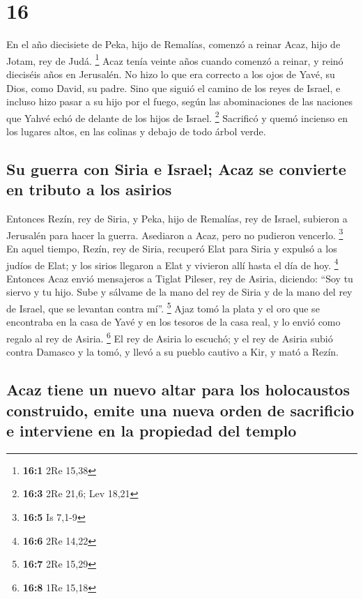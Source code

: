 \hypertarget{section-15}{%
\section{16}\label{section-15}}

 En el año diecisiete de Peka, hijo de Remalías, comenzó a
reinar Acaz, hijo de Jotam, rey de Judá. \footnote{\textbf{16:1} 2Re
  15,38}  Acaz tenía veinte años cuando comenzó a reinar,
y reinó dieciséis años en Jerusalén. No hizo lo que era correcto a los
ojos de Yavé, su Dios, como David, su padre.  Sino que
siguió el camino de los reyes de Israel, e incluso hizo pasar a su hijo
por el fuego, según las abominaciones de las naciones que Yahvé echó de
delante de los hijos de Israel. \footnote{\textbf{16:3} 2Re 21,6; Lev
  18,21}  Sacrificó y quemó incienso en los lugares altos,
en las colinas y debajo de todo árbol verde.

\hypertarget{su-guerra-con-siria-e-israel-acaz-se-convierte-en-tributo-a-los-asirios}{%
\subsection{Su guerra con Siria e Israel; Acaz se convierte en tributo a
los
asirios}\label{su-guerra-con-siria-e-israel-acaz-se-convierte-en-tributo-a-los-asirios}}

 Entonces Rezín, rey de Siria, y Peka, hijo de Remalías,
rey de Israel, subieron a Jerusalén para hacer la guerra. Asediaron a
Acaz, pero no pudieron vencerlo. \footnote{\textbf{16:5} Is 7,1-9}
 En aquel tiempo, Rezín, rey de Siria, recuperó Elat para
Siria y expulsó a los judíos de Elat; y los sirios llegaron a Elat y
vivieron allí hasta el día de hoy. \footnote{\textbf{16:6} 2Re 14,22}
 Entonces Acaz envió mensajeros a Tiglat Pileser, rey de
Asiria, diciendo: ``Soy tu siervo y tu hijo. Sube y sálvame de la mano
del rey de Siria y de la mano del rey de Israel, que se levantan contra
mí''. \footnote{\textbf{16:7} 2Re 15,29}  Ajaz tomó la
plata y el oro que se encontraba en la casa de Yavé y en los tesoros de
la casa real, y lo envió como regalo al rey de Asiria. \footnote{\textbf{16:8}
  1Re 15,18}  El rey de Asiria lo escuchó; y el rey de
Asiria subió contra Damasco y la tomó, y llevó a su pueblo cautivo a
Kir, y mató a Rezín.

\hypertarget{acaz-tiene-un-nuevo-altar-para-los-holocaustos-construido-emite-una-nueva-orden-de-sacrificio-e-interviene-en-la-propiedad-del-templo}{%
\subsection{Acaz tiene un nuevo altar para los holocaustos construido,
emite una nueva orden de sacrificio e interviene en la propiedad del
templo}\label{acaz-tiene-un-nuevo-altar-para-los-holocaustos-construido-emite-una-nueva-orden-de-sacrificio-e-interviene-en-la-propiedad-del-templo}}

